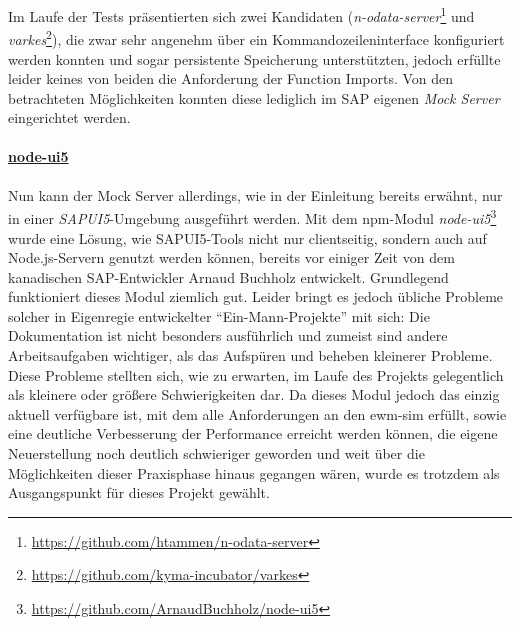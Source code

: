 Im Laufe der Tests präsentierten sich zwei Kandidaten (\emph{n-odata-server}\footnote{\url{https://github.com/htammen/n-odata-server}} und \emph{varkes}\footnote{\url{https://github.com/kyma-incubator/varkes}}), die zwar sehr angenehm über ein Kommandozeileninterface konfiguriert werden konnten und sogar persistente Speicherung unterstützten, jedoch erfüllte leider keines von beiden die Anforderung der Function Imports.
Von den betrachteten Möglichkeiten konnten diese lediglich im SAP eigenen \emph{Mock Server} eingerichtet werden.

\paragraph{\href{https://github.com/ArnaudBuchholz/node-ui5}{node-ui5}}
Nun kann der Mock Server allerdings, wie in der Einleitung bereits erwähnt, nur in einer \emph{SAPUI5}-Umgebung ausgeführt werden.
Mit dem \ac{npm}-Modul \emph{node-ui5}\footnote{\url{https://github.com/ArnaudBuchholz/node-ui5}} wurde eine Lösung, wie SAPUI5-Tools nicht nur clientseitig, sondern auch auf Node.js-Servern genutzt werden können, bereits vor einiger Zeit von dem kanadischen SAP-Entwickler Arnaud Buchholz entwickelt.
Grundlegend funktioniert dieses Modul ziemlich gut.
Leider bringt es jedoch übliche Probleme solcher in Eigenregie entwickelter \enquote{Ein-Mann-Projekte} mit sich: Die Dokumentation ist nicht besonders ausführlich und zumeist sind andere Arbeitsaufgaben wichtiger, als das Aufspüren und beheben kleinerer Probleme.
Diese Probleme stellten sich, wie zu erwarten, im Laufe des Projekts gelegentlich als kleinere oder größere Schwierigkeiten dar.
Da dieses Modul jedoch das einzig aktuell verfügbare ist, mit dem alle Anforderungen an den \ac{ewm-sim} erfüllt, sowie eine deutliche Verbesserung der Performance erreicht werden können, die eigene Neuerstellung noch deutlich schwieriger geworden und weit über die Möglichkeiten dieser Praxisphase hinaus gegangen wären, wurde es trotzdem als Ausgangspunkt für dieses Projekt gewählt.~\cite{node-ui5-npm, node-ui5-github}